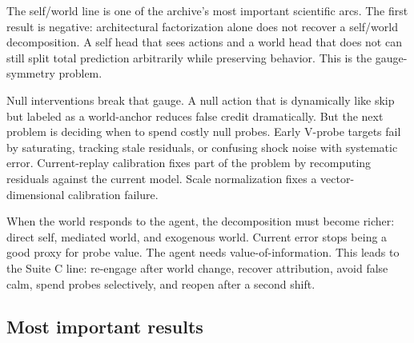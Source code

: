 \documentclass[11pt]{article}
\begin{document}
The self/world line is one of the archive's most important scientific arcs.
The first result is negative: architectural factorization alone does not
recover a self/world decomposition. A self head that sees actions and a world
head that does not can still split total prediction arbitrarily while preserving
behavior. This is the gauge-symmetry problem.

Null interventions break that gauge. A null action that is dynamically like
skip but labeled as a world-anchor reduces false credit dramatically. But the
next problem is deciding when to spend costly null probes. Early V-probe
targets fail by saturating, tracking stale residuals, or confusing shock noise
with systematic error. Current-replay calibration fixes part of the problem by
recomputing residuals against the current model. Scale normalization fixes a
vector-dimensional calibration failure.

When the world responds to the agent, the decomposition must become richer:
direct self, mediated world, and exogenous world. Current error stops being a
good proxy for probe value. The agent needs value-of-information. This leads to
the Suite C line: re-engage after world change, recover attribution, avoid
false calm, spend probes selectively, and reopen after a second shift.

\subsection{Most important results}
\end{document}
